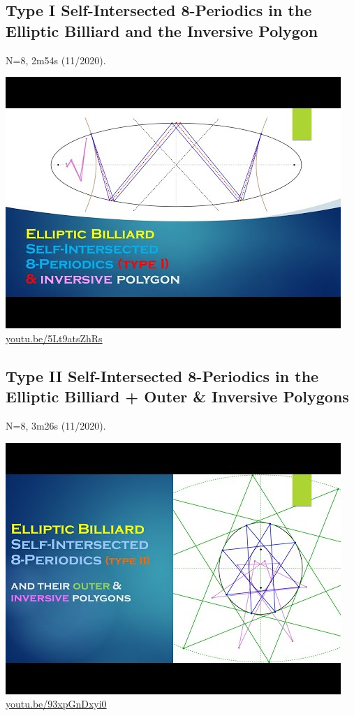 \documentclass[12pt]{amsart}
\begin{document}
\subsection{Type I Self-Intersected 8-Periodics in the Elliptic Billiard and the Inversive Polygon}
\label{vid:5Lt9atsZhRs}
\noindent N=8, 2m54s (11/2020). 
\begin{center}\includegraphics[width=.5\textwidth]{pics/5Lt9atsZhRs.jpg} \\ 
\href{https://youtu.be/5Lt9atsZhRs}{\url{youtu.be/5Lt9atsZhRs}}\end{center}
% 

\subsection{Type II Self-Intersected 8-Periodics in the Elliptic Billiard + Outer \& Inversive Polygons}
\label{vid:93xpGnDxyi0}
\noindent N=8, 3m26s (11/2020). 
\begin{center}\includegraphics[width=.5\textwidth]{pics/93xpGnDxyi0.jpg} \\ 
\href{https://youtu.be/93xpGnDxyi0}{\url{youtu.be/93xpGnDxyi0}}\end{center}
% 
\end{document}
